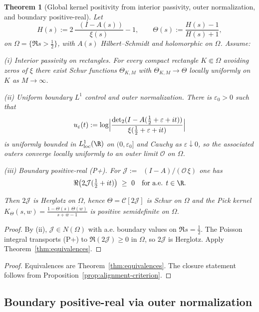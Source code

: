 \documentclass[11pt]{article}
\newtheorem{theorem}{Theorem}
\theoremstyle{remark}
\DeclareMathOperator{\dettwo}{det_2}
\begin{document}
\begin{theorem}[Global kernel positivity from interior passivity, outer normalization, and boundary positive-real]\label{thm:global-PSD}
Let
\[
  H(s):=2\,\frac{\dettwo(I-A(s))}{\xi(s)}-1,\qquad
  \Theta(s):=\frac{H(s)-1}{H(s)+1},
\]
on \(\Omega=\{\Re s>\tfrac12\}\), with $A(s)$ Hilbert--Schmidt and holomorphic on \(\Omega\).
Assume:

\emph{(i) Interior passivity on rectangles.} For every compact rectangle $K\Subset\Omega$ avoiding zeros of \(\xi\) there exist Schur functions \(\Theta_{K,M}\) with \(\Theta_{K,M}\to\Theta\) locally uniformly on $K$ as $M\to\infty$.

\emph{(ii) Uniform boundary $L^1$ control and outer normalization.} There is \(\varepsilon_0>0\) such that
\[
  u_\varepsilon(t):=\log\Bigl|\frac{\dettwo(I-A(\tfrac12+\varepsilon+it))}{\xi(\tfrac12+\varepsilon+it)}\Bigr|
\]
is uniformly bounded in $L^1_{\mathrm{loc}}(\R)$ on $(0,\varepsilon_0]$ and Cauchy as \(\varepsilon\downarrow0\), so the associated outers converge locally uniformly to an outer limit \(\mathcal O\) on \(\Omega\).

\emph{(iii) Boundary positive-real (P+).} For \(\mathcal J:=\dettwo(I-A)/(\mathcal O\,\xi)\) one has
\[
 \Re\big(2\mathcal J(\tfrac12+it)\big)\ \ge\ 0\quad\text{for a.e. }t\in\R.
\]

Then \(2\mathcal J\) is Herglotz on \(\Omega\), hence \(\Theta=\mathcal C[2\mathcal J]\) is Schur on \(\Omega\) and the Pick kernel
\(
  K_\Theta(s,w)=\frac{1-\Theta(s)\,\overline{\Theta(w)}}{s+\overline{w}-1}
\)
is positive semidefinite on \(\Omega\).
\end{theorem}

\begin{proof}
By (ii), \(\mathcal J\in N(\Omega)\) with a.e. boundary values on \(\Re s=\tfrac12\). The Poisson integral transports (P+) to \(\Re(2\mathcal J)\ge0\) in \(\Omega\), so \(2\mathcal J\) is Herglotz. Apply Theorem~\ref{thm:equivalences}.
\end{proof}
\begin{proof}
Equivalences are Theorem~\ref{thm:equivalences}. The closure statement follows from Proposition~\ref{prop:alignment-criterion}.
\end{proof}

\subsection{Boundary positive-real via outer normalization}\label{subsec:boundary-unitarity}
\end{document}
